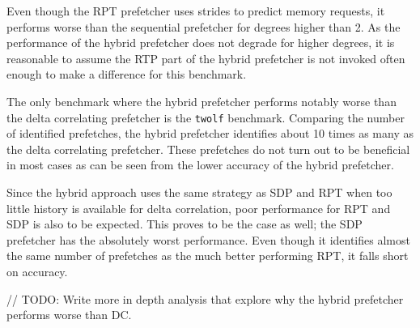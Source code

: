 Even though the RPT prefetcher uses strides to predict memory requests, it
performs worse than the sequential prefetcher for degrees higher than 2.
As the performance of the hybrid prefetcher does not degrade for higher degrees,
it is reasonable to assume the RTP part of the hybrid prefetcher is not invoked
often enough to make a difference for this benchmark.

The only benchmark where the hybrid prefetcher performs notably worse than the
delta correlating prefetcher is the \texttt{twolf} benchmark.
Comparing the number of identified prefetches, the hybrid prefetcher identifies
about 10 times as many as the delta correlating prefetcher.
These prefetches do not turn out to be beneficial in most cases as can be seen
from the lower accuracy of the hybrid prefetcher.

Since the hybrid approach uses the same strategy as SDP and RPT when too little
history is available for delta correlation, poor performance for RPT and SDP is
also to be expected.
This proves to be the case as well; the SDP prefetcher has the absolutely worst
performance.
Even though it identifies almost the same number of prefetches as the much
better performing RPT, it falls short on accuracy.

// TODO: Write more in depth analysis that explore why the hybrid prefetcher performs worse than DC.


